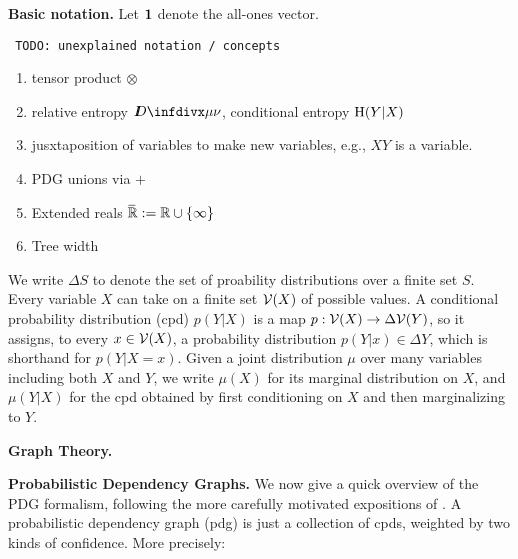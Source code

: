 \documentclass[twoside]{article}
\begin{document}
\textbf{Basic notation.}
Let $\mathbf{1}$ denote the all-ones vector.

{\color{red}\tt
TODO: unexplained notation / concepts
\begin{enumerate}[nosep]
\raggedright
\item tensor product $\otimes$
\item relative entropy $\kldiv\mu\nu$, conditional entropy $\operatorname{\mathrm{H}}(Y|X)$
\item jusxtaposition of variables to make new variables, e.g., $XY$ is a variable.
\item PDG unions via $+$
\item Extended reals $\mskip1mu\overline{\mskip-1mu\mathbb R\!}\, := \mathbb R \cup \{\infty\}$
\item Tree width
\end{enumerate}
}


We write $\Delta S$ to denote the set of proability distributions over a finite set $S$.
Every variable $X$ can take on a finite set $\mathcal V(X)$ of possible values. 
A conditional probability distribution (cpd) $p(Y|X)$ is a map 
$p : \mathcal V(X) \to \Delta \mathcal V(Y)$, so it assigns, to every $x \in \mathcal V(X)$, a probability distribution $p(Y|x) \in \Delta Y$, which is shorthand for $p(Y|X\!\!=\!x)$.
Given a joint distribution $\mu$ over many variables including both $X$ and $Y$, 
we write $\mu(X)$ for its marginal distribution on $X$, and $\mu(Y|X)$ for the cpd obtained by first conditioning on $X$ and then marginalizing to $Y$. 

\textbf{Graph Theory.}

\textbf{Probabilistic Dependency Graphs.}
We now give a quick overview of the PDG formalism,
following the more carefully motivated
expositions of \textcite{pdg-aaai,one-true-loss}.
%
%
A probabilistic dependency graph (pdg) is just a collection of cpds, weighted by two kinds of confidence. More precisely:
\end{document}
